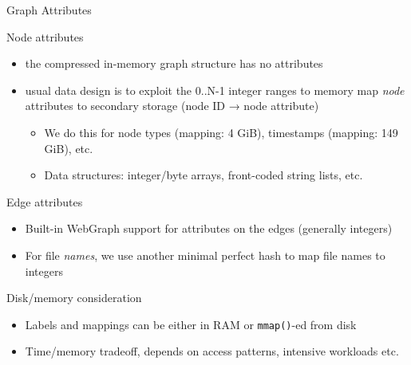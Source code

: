 \documentclass[aspectratio=169,xcolor=table]{beamer}
\begin{document}
    \begin{frame}{Graph Attributes}
        \begin{block}{Node attributes}
            \begin{itemize}
                \item the compressed in-memory graph structure has \alert{no attributes}
                \item usual data design is to exploit the 0..N-1 integer ranges to \alert{memory map
                    \emph{node} attributes} to secondary storage (node ID →
                    node attribute)
                    \begin{itemize}
                        \item We do this for node types (mapping: 4 GiB),
                            timestamps (mapping: 149 GiB), etc.
                        \item Data structures: integer/byte arrays, front-coded
                            string lists, etc.
                    \end{itemize}
            \end{itemize}
        \end{block}
        \begin{block}{Edge attributes}
            \begin{itemize}
                \item Built-in WebGraph support for attributes on the \alert{edges} (generally integers)
                \item For file \emph{names}, we use another minimal perfect hash to map file names to integers
            \end{itemize}
        \end{block}
        \begin{block}{Disk/memory consideration}
            \begin{itemize}
                \item Labels and mappings can be either in RAM or
                    \texttt{mmap()}-ed from disk
                \item Time/memory tradeoff, depends on access patterns, intensive
                    workloads etc.
            \end{itemize}
        \end{block}
    \end{frame}
\end{document}

